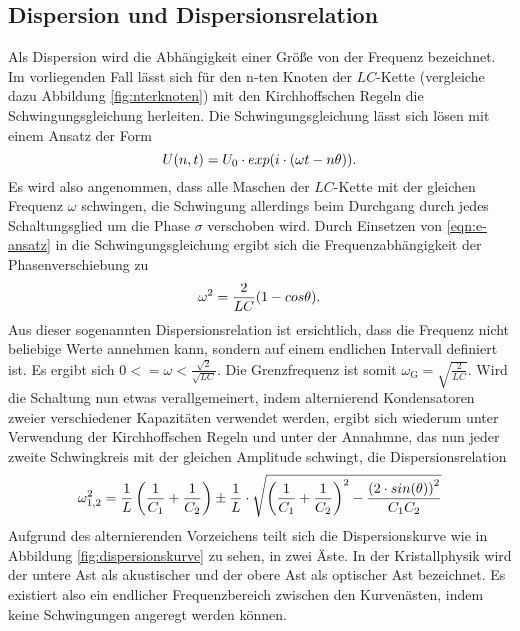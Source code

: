 \subsection{Dispersion und Dispersionsrelation}
\label{subsec-dispersion}
Als Dispersion wird die Abhängigkeit einer Größe von der Frequenz bezeichnet.
Im vorliegenden Fall lässt sich für den n-ten Knoten der $LC$-Kette (vergleiche dazu
Abbildung \eqref{fig:nterknoten}) mit den Kirchhoffschen Regeln die Schwingungsgleichung herleiten.
Die Schwingungsgleichung lässt sich lösen mit einem Ansatz der Form
\begin{equation}
\centering
U(n,t)=U_{\mathrm{0}} \cdot exp(i\cdot( \omega t- n\theta )).
\label{eqn:e-ansatz}
\end{equation}
Es wird also angenommen, dass alle Maschen der $LC$-Kette mit der gleichen Frequenz $\omega$ schwingen, die Schwingung allerdings beim Durchgang durch jedes Schaltungsglied um die Phase $\sigma$ verschoben wird.
Durch Einsetzen von \eqref{eqn:e-ansatz} in die Schwingungsgleichung ergibt sich die Frequenzabhängigkeit der Phasenverschiebung zu
\begin{equation}
\centering
\omega^2=\frac{2}{LC}(1-cos{\theta}).
\label{eqn:dispersion}
\end{equation}
Aus dieser sogenannten Dispersionsrelation ist ersichtlich, dass die Frequenz \omega nicht beliebige Werte annehmen kann,
sondern auf einem endlichen Intervall definiert ist.
Es ergibt sich $0<=\omega<\frac{\sqrt{2}}{\sqrt{LC}}$.
Die Grenzfrequenz ist somit $\omega_{\mathrm{G}}=\sqrt{\frac{2}{LC}}$.
Wird die Schaltung nun etwas verallgemeinert, indem alternierend Kondensatoren zweier verschiedener Kapazitäten verwendet werden,
ergibt sich wiederum unter Verwendung der Kirchhoffschen Regeln und unter der Annahmne, das nun jeder zweite Schwingkreis mit der gleichen Amplitude
schwingt, die Dispersionsrelation
\begin{equation}
  \centering
 \omega_{1,2}^2=\frac{1}{L}\left ( \frac{1}{C_{\mathrm{1}}}+\frac{1}{C_{\mathrm{2}}} \right ) \pm \frac{1}{L} \cdot \sqrt{\left ( \frac{1}{C_{\mathrm{1}}}+\frac{1}{C_{\mathrm{2}}} \right )^2-\frac{\left(2\cdot sin(\theta)\right)^2}{C_{\mathrm{1}}C_{\mathrm{2}}}}
  \label{eqn:dispersion2}
\end{equation}
Aufgrund des alternierenden Vorzeichens teilt sich die Dispersionskurve wie in Abbildung \ref{fig:dispersionskurve} zu sehen, in zwei Äste.
In der Kristallphysik wird der untere Ast als akustischer und der obere Ast als optischer Ast bezeichnet.
Es existiert also ein endlicher Frequenzbereich zwischen den Kurvenästen, indem keine Schwingungen angeregt werden können.

